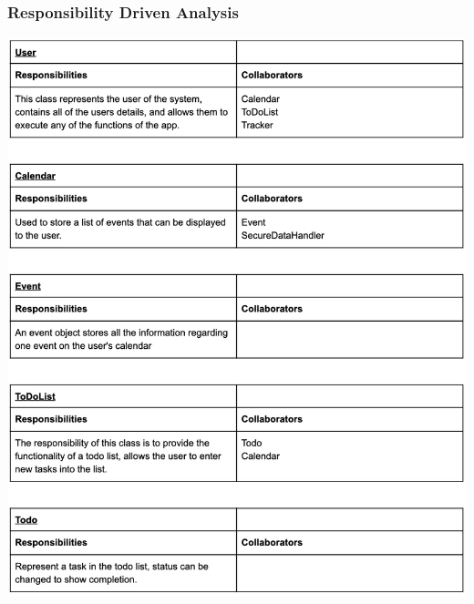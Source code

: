 \documentclass[a4paper,11pt]{article} %
\begin{document}
\subsubsection*{Responsibility Driven Analysis}
\vspace{1cm}
\begin{center}
  \includegraphics[width=\textwidth]{img/noun-verb/rda-table1.png}
  \newpage

\end{center}
\end{document}
